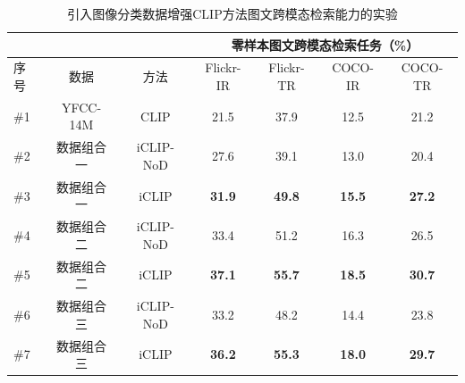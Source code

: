 \begin{table}
    \centering
    \caption{引入图像分类数据增强CLIP方法图文跨模态检索能力的实验}
    \begin{tabular}{lcccccc}
    \toprule
        \multicolumn{1}{c}{} &
        \multicolumn{1}{c}{} & \multicolumn{1}{c}{} & \multicolumn{4}{c}{零样本图文跨模态检索任务（\%）} \\
        \midrule
        序号 & 数据 & 方法 & Flickr-IR & Flickr-TR & COCO-IR & COCO-TR    \\
        \midrule
        \#1 & YFCC-14M & CLIP  & 21.5 & 37.9 & 12.5 & 21.2  \\

        \#2 & 数据组合一 & iCLIP-NoD  & 27.6 & 39.1 & 13.0 & 20.4 \\  
                
        \#3 & 数据组合一 & iCLIP & \textbf{31.9} & \textbf{49.8} & \textbf{15.5} & \textbf{27.2} \\    
        
        \midrule
        
        \#4 & 数据组合二 & iCLIP-NoD & 33.4 & 51.2 & 16.3 & 26.5  \\  
                
        \#5 & 数据组合二 & iCLIP & \textbf{37.1} & \textbf{55.7} & \textbf{18.5} & \textbf{30.7} \\   
        
        \midrule
        
        \#6 & 数据组合三 & iCLIP-NoD & 33.2 & 48.2 & 14.4 & 23.8 \\
        
        \#7 & 数据组合三 & iCLIP & \textbf{36.2} & \textbf{55.3} & \textbf{18.0} & \textbf{29.7} \\

        \bottomrule
    \end{tabular}
    \label{tab:iclip-ablate_yfcc_retrieval}
\end{table}

